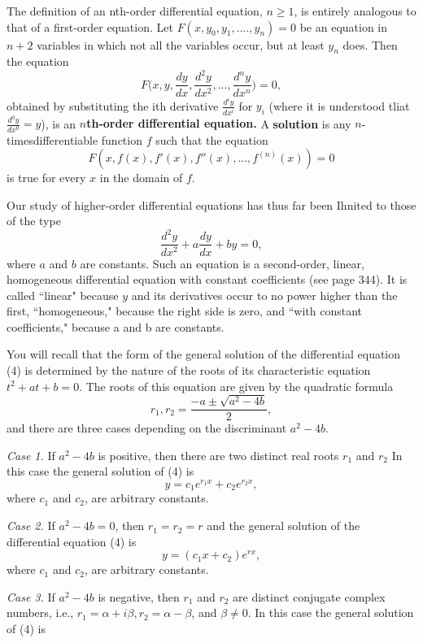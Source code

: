 The definition of an nth-order differential equation, $n \geq 1$, is entirely analogous to that of a first-order equation. Let $F(x, y_0, y_1, ...., y_n) = 0$ be an equation in $n + 2$ variables in which not all the variables occur, but at least $y_n$ does. Then the equation
\begin{equation}
F \Big(x, y, \frac{dy}{dx}, \frac{d^2y}{dx^2} , ... , \frac{d^ny}{dx^n} \Big) = 0, 
\label{eq11.1.3}
\end{equation}
obtained by substituting the ith derivative $\frac{d^iy}{dx^i}$ for $y_i$ (where it is understood tliat $\frac{d^0y}{dx^0} = y$), is an \textbf{$n$th-order differential equation.}  A \textbf{solution} is any $n$-timesdifferentiable function $f$ such that the equation
$$
F(x, f(x), f'(x), f''(x), ... ,f^{(n)}(x)) = 0
$$
is true for every $x$ in the domain of $f$.

Our study of higher-order differential equations has thus far been Ihnited to those of the type
\begin{equation}
\frac{d^2y}{dx^2} + a\frac{dy}{dx} + by = 0,  
\label{eq11.1.4}
\end{equation}
where $a$ and $b$ are constants. Such an equation is a second-order, linear, homogeneous differential equation with constant coefficients (see page 344). It is called ``linear" because $y$ and its derivatives occur to no power higher than the first, ``homogeneous," because the right side is zero, and ``with constant coefficients," because a and b are constants.

You will recall that the form of the general solution of the differential equation (4) is determined by the nature of the roots of its characteristic equation $t^2 + at + b = 0$. The roots of this equation are given by the quadratic formula
$$
r_1, r_2 = \frac{-a \pm \sqrt{a^2 - 4b}}{2} ,
$$
and there are three cases depending on the discriminant $a^2 - 4b$.
\medskip

\textit{Case 1.} If $a^2 - 4b$ is positive, then there are two distinct real roots $r_1$ and $r_2$ In this case the general solution of (4) is
$$
y = c_1e^{r_1x} + c_2e^{r_2x} ,
$$ 
where $c_1$ and $c_2$, are arbitrary constants.
\medskip

\textit{Case 2.} If $a^2 - 4b = 0$, then $r_1 = r_2 = r$ and the general solution of the differential equation (4) is
$$
y = (c_1x + c_2) e^{rx}, 
$$
where $c_1$ and $c_2$, are arbitrary constants.
\medskip

\textit{Case 3.} If $a^2 - 4b$ is negative, then $r_1$ and $r_2$ are distinct conjugate complex numbers, i.e., $r_1 = \alpha + i\beta, r_2 = \alpha - \beta$, and $\beta \neq 0$. In this case the general solution of (4) is

